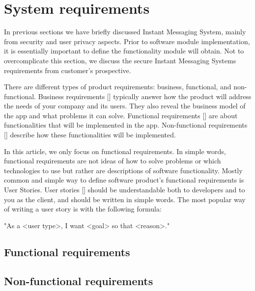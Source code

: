 \chapter{System requirements}\label{ch:system-requirements}

In previous sections we have briefly discussed Instant Messaging System, mainly from security and user privacy aspects.
Prior to software module implementation, it is essentially important to define the functionality module will obtain.
Not to overcomplicate this section, we discuss the secure Instant Messaging Systems requirements from customer's prospective.

There are different types of product requirements: business, functional, and non-functional.
Business requirements [\cite{dilworth2007creation}] typically answer how the product will address the needs of your company and its users.
They also reveal the business model of the app and what problems it can solve.
Functional requirements [\cite{malan2001functional}] are about functionalities that will be implemented in the app.
Non-functional requirements [\cite{chung2012non}] describe how these functionalities will be implemented.

In this article, we only focus on functional requirements.
In simple words, functional requirements are not ideas of how to solve problems or which technologies to use but rather
are descriptions of software functionality.
Mostly common and simple way to define software product's functional requirements is User Stories.
User stories [\cite{cohn2004user}] should be understandable both to developers and to you as the client, and should be written in simple words.
The most popular way of writing a user story is with the following formula:

\begin{center}
    \begin{spverbatim}
        "As a <user type>, I want <goal> so that <reason>."
    \end{spverbatim}
\end{center}


\section{Functional requirements}\label{sec:functional-requirements}



\section{Non-functional requirements}\label{sec:non-functional-requirements}



